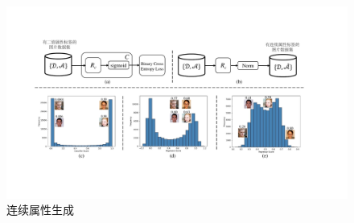 \begin{figure}[!t]
  \centering
  \includegraphics[width=1.0\linewidth]{figures/ACGAN/continue.pdf}
  \caption{连续属性生成}
  \label{fig:quantization}
\end{figure}

